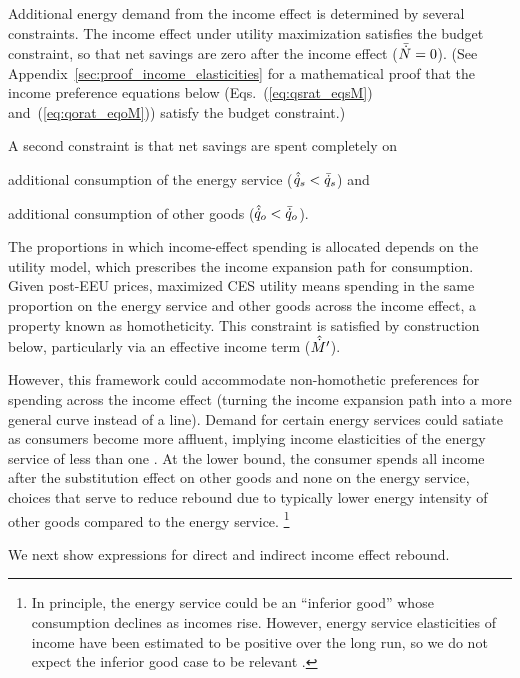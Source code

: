 \documentclass[12pt]{article}\usepackage[]{graphicx}\usepackage[]{xcolor}
\begin{document}
Additional energy demand from the income effect
is determined by several constraints.
The income effect under utility maximization
satisfies the budget constraint, so that
net savings are zero after
the income effect ($\bar{\dot{N}} = 0$).
(See Appendix~\ref{sec:proof_income_elasticities}
for a mathematical proof that the income preference equations below
(Eqs.~(\ref{eq:qsrat_eqsM}) and~(\ref{eq:qorat_eqoM}))
satisfy the budget constraint.)

A second constraint is that net savings are spent completely on
%
\begin{enumerate*}[label={(\roman*)}]
	
  \item additional consumption of the energy service ($\hat{\dot{q}}_s < \bar{\dot{q}}_s$) and
  
  \item additional consumption of other goods ($\hat{\dot{q}}_o < \bar{\dot{q}}_o$).
    
\end{enumerate*}
%
The proportions in which income-effect spending is allocated
depends on the utility model, 
which prescribes the income expansion path for consumption. 
Given post-EEU prices, maximized CES utility 
means spending in the same proportion on the energy service and other goods 
across the income effect, 
a property known as homotheticity.
This constraint is satisfied by construction below, 
particularly via an effective income term ($\hat{\dot{M}}^\prime$).

However, this framework could accommodate 
non-homothetic preferences
for spending across the income effect
(turning the income
expansion path into a more general curve instead of a line).
Demand for certain energy services could satiate 
as consumers become more affluent, 
implying income elasticities 
of the energy service of less than one \citep{Greening2000}. 
At the lower bound, 
the consumer spends all income after the substitution effect on other goods and none on the energy service,
choices that serve to reduce rebound 
due to typically lower energy intensity of other goods compared to the energy service.%
\footnote{
  In principle, the energy service could be an     
  ``inferior good'' whose consumption declines as incomes rise. 
  However, energy service elasticities of income
  have been estimated 
  to be positive over the long run,
  so we do not expect the inferior good case
  to be relevant \citep{Fouquet2014}.
}

We next show expressions for 
direct and indirect income effect rebound.
\end{document}
